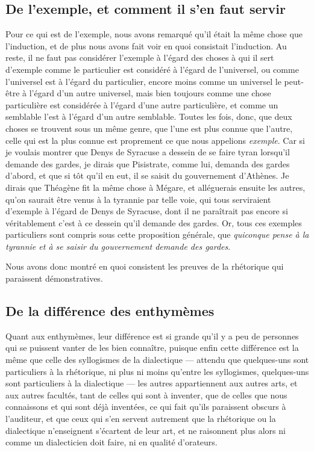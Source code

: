 \subsection{De l'exemple, et comment il s'en faut servir}

Pour ce qui est de l'exemple, nous avons remarqué qu'il était la même chose que l'induction, et de plus nous avons fait voir en quoi consistait l'induction.
Au reste, il ne faut pas considérer l'exemple à l'égard des choses à qui il sert d'exemple comme le particulier est considéré à l'égard de l'universel, ou
comme l'universel est à l'égard du particulier, encore moins comme un universel le peut-être à l'égard d'un autre universel, mais bien toujours comme une chose
particulière est considérée à l'égard d'une autre particulière, et comme un semblable l'est à l'égard d'un autre semblable. Toutes les fois, donc, que deux
choses se trouvent sous un même genre, que l'une est plus connue que l'autre, celle qui est la plus connue est proprement ce que nous appelions \emph{exemple}.
Car si je voulais montrer que Denys de Syracuse a dessein de se faire tyran lorsqu'il demande des gardes, je dirais que Pisistrate, comme lui, demanda des gardes
d'abord, et que si tôt qu'il en eut, il se saisit du gouvernement d'Athènes. Je dirais que Théagène fit la même chose à Mégare, et alléguerais ensuite les autres,
qu'on saurait être venus à la tyrannie par telle voie, qui tous serviraient d'exemple à l'égard de Denys de Syracuse, dont il ne paraîtrait pas encore si véritablement
c'est à ce dessein qu'il demande des gardes. Or, tous ces exemples particuliers sont compris sous cette proposition générale, que \emph{quiconque pense à la tyrannie
et à se saisir du gouvernement demande des gardes}.

Nous avons donc montré en quoi consistent les preuves de la rhétorique qui paraissent démonstratives.

\subsection{De la différence des enthymèmes}

Quant aux enthymèmes, leur différence est si grande qu'il y a peu de personnes qui se puissent vanter de les bien connaître, puisque enfin cette
différence est la même que celle des  syllogismes de la dialectique --- attendu que quelques-uns sont particuliers à la rhétorique, ni plus ni moins
qu'entre les syllogismes, quelques-uns sont particuliers à la dialectique --- les autres  appartiennent aux autres arts, et aux autres facultés, tant
de celles qui sont à inventer, que de celles que nous connaissons et qui sont déjà inventées, ce qui fait qu'ils paraissent obscurs à l'auditeur, et
que ceux qui s'en servent autrement que la rhétorique ou la dialectique n'enseignent s'écartent de leur art, et ne raisonnent  plus alors ni comme un
dialecticien doit faire, ni en qualité d'orateurs.

